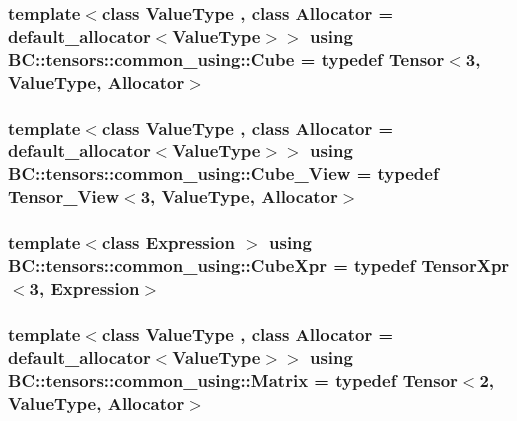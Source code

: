 \subsubsection[{\texorpdfstring{Cube}{Cube}}]{\setlength{\rightskip}{0pt plus 5cm}template$<$class Value\+Type , class Allocator  = default\+\_\+allocator$<$\+Value\+Type$>$$>$ using {\bf B\+C\+::tensors\+::common\+\_\+using\+::\+Cube} = typedef {\bf Tensor}$<$3, Value\+Type, {\bf Allocator}$>$}\hypertarget{namespaceBC_1_1tensors_1_1common__using_af5058c3831b2497cff925e51a93737d8}{}\label{namespaceBC_1_1tensors_1_1common__using_af5058c3831b2497cff925e51a93737d8}
\subsubsection[{\texorpdfstring{Cube\+\_\+\+View}{Cube_View}}]{\setlength{\rightskip}{0pt plus 5cm}template$<$class Value\+Type , class Allocator  = default\+\_\+allocator$<$\+Value\+Type$>$$>$ using {\bf B\+C\+::tensors\+::common\+\_\+using\+::\+Cube\+\_\+\+View} = typedef {\bf Tensor\+\_\+\+View}$<$3, Value\+Type, {\bf Allocator}$>$}\hypertarget{namespaceBC_1_1tensors_1_1common__using_aebb5c43471e1526b4e27c2c6bd26a1f5}{}\label{namespaceBC_1_1tensors_1_1common__using_aebb5c43471e1526b4e27c2c6bd26a1f5}
\subsubsection[{\texorpdfstring{Cube\+Xpr}{CubeXpr}}]{\setlength{\rightskip}{0pt plus 5cm}template$<$class Expression $>$ using {\bf B\+C\+::tensors\+::common\+\_\+using\+::\+Cube\+Xpr} = typedef {\bf Tensor\+Xpr}$<$3, Expression$>$}\hypertarget{namespaceBC_1_1tensors_1_1common__using_ad8b8adb3201b9219bdaefd7b6afb6e9f}{}\label{namespaceBC_1_1tensors_1_1common__using_ad8b8adb3201b9219bdaefd7b6afb6e9f}
\subsubsection[{\texorpdfstring{Matrix}{Matrix}}]{\setlength{\rightskip}{0pt plus 5cm}template$<$class Value\+Type , class Allocator  = default\+\_\+allocator$<$\+Value\+Type$>$$>$ using {\bf B\+C\+::tensors\+::common\+\_\+using\+::\+Matrix} = typedef {\bf Tensor}$<$2, Value\+Type, {\bf Allocator}$>$}\hypertarget{namespaceBC_1_1tensors_1_1common__using_a6fc3153d379a42b1a97df46ed5b71a29}{}\label{namespaceBC_1_1tensors_1_1common__using_a6fc3153d379a42b1a97df46ed5b71a29}
